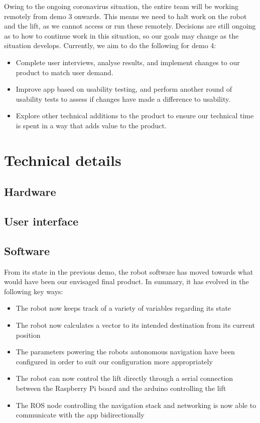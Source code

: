 \documentclass{article}
\begin{document}
Owing to the ongoing coronavirus situation, the entire team will be working remotely from demo 3 onwards. This means we need to halt work on the robot and the lift, as we cannot access or run these remotely. Decisions are still ongoing as to how to continue work in this situation, so our goals may change as the situation develops. Currently, we aim to do the following for demo 4:
\begin{itemize}
  \item Complete user interviews, analyse results, and implement changes to our product to match user demand.
  \item Improve app based on usability testing, and perform another round of usability tests to assess if changes have made a difference to usability. 
  \item Explore other technical additions to the product to ensure our technical time is spent in a way that adds value to the product. 
\end{itemize}

\section{Technical details}

\subsection{Hardware}

\subsection{User interface}

\subsection{Software}

From its state in the previous demo, the robot software has moved towards what would have been our envisaged final product. In summary, it has evolved in the following key ways:

\begin{itemize}
  \item The robot now keeps track of a variety of variables regarding its state
  \item The robot now calculates a vector to its intended destination from its current position
  \item The parameters powering the robots autonomous navigation have been configured in order to suit our configuration more appropriately
  \item The robot can now control the lift directly through a serial connection between the Raspberry Pi board and the arduino controlling the lift
  \item The ROS node controlling the navigation stack and networking is now able to communicate with the app bidirectionally
\end{itemize}
\end{document}
